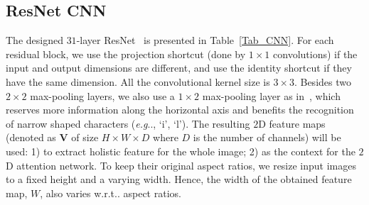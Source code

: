 \documentclass[letterpaper]{article} \usepackage{aaai19}  \usepackage{times}  \usepackage{helvet}  \usepackage{courier}  \usepackage{url}  \usepackage{graphicx}  \usepackage{amsmath}
\makeatletter
\DeclareRobustCommand\onedot{\futurelet\@let@token\@onedot}
\def\@onedot{\ifx\@let@token.\else.\null\fi\xspace}
\def\eg{\emph{e.g}\onedot} \def\Eg{\emph{E.g}\on/edot}
\def\wrt{w.r.t\onedot} \def\dof{d.o.f\onedot}
\makeatother
\begin{document}
\subsection{ResNet CNN}
The designed $31$-layer ResNet~\cite{ResidualNetwork} is presented in Table~\ref{Tab_CNN}.
For each residual block, we use the projection shortcut (done by $1 \times 1$ convolutions) if the input and output  dimensions are different, and use the identity shortcut if they have the same dimension. All the convolutional kernel size is $3 \times 3$. Besides two $2 \times 2$ max-pooling layers, we also use a $1 \times 2$ max-pooling layer as in~\cite{ShiBY15}, which reserves more information along the horizontal axis and benefits the recognition of narrow shaped characters (\eg, `i', `l'). The resulting $2$D feature maps (denoted as $\mathbf{V}$ of size $H \times W \times D$ where $D$ is the number of channels) will be used: 1) to extract holistic feature for the whole image; 2) as the context for the $2$D attention network.
To keep their original aspect ratios, we resize input images to a fixed height and a varying width.
Hence, the width of the obtained feature map, $W$, also varies \wrt aspect ratios.
\end{document}
